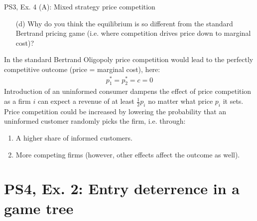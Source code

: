 \begin{frame}{PS3, Ex. 4 (A): Mixed strategy price competition}
    \begin{itemize}
      \item[(d)] Why do you think the equilibrium is so different from the standard Bertrand pricing game (i.e. where competition drives price down to marginal cost)?
    \end{itemize}
    In the standard Bertrand Oligopoly price competition would lead to the perfectly competitive outcome (price = marginal cost), here:
    \begin{align*}
      p_1^{*}=p_2^{*}=c=0
    \end{align*}
    Introduction of an uninformed consumer dampens the effect of price competition as a firm $i$ can expect a revenue of at least $\frac{1}{2}p_i$ no matter what price $p_i$ it sets.\\\medskip
    Price competition could be increased by lowering the probability that an uninformed customer randomly picks the firm, i.e. through:
    \begin{enumerate}
      \item A higher share of informed customers.
      \item More competing firms (however, other effects affect the outcome as well).
    \end{enumerate}
  \vfill\null
\end{frame}


\section{PS4, Ex. 2: Entry deterrence in a game tree}

